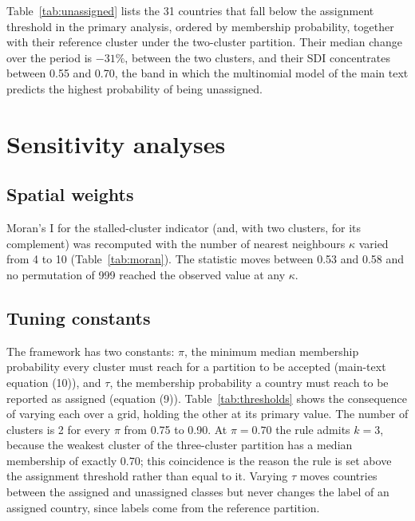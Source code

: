 \documentclass[11pt,a4paper]{article}
\begin{document}
Table~\ref{tab:unassigned} lists the 31 countries that fall below the assignment threshold in the primary analysis, ordered by membership probability, together with their reference cluster under the two-cluster partition. Their median change over the period is $-31\%$, between the two clusters, and their SDI concentrates between 0.55 and 0.70, the band in which the multinomial model of the main text predicts the highest probability of being unassigned.

\begin{table}[h]
\centering\small
\caption{Countries unassigned in the primary analysis. The reference cluster is the label the country carries in the two-cluster partition before the threshold is applied.}
\label{tab:unassigned}
\end{table}

\section{Sensitivity analyses}

\subsection{Spatial weights}

Moran's I for the stalled-cluster indicator (and, with two clusters, for its complement) was recomputed with the number of nearest neighbours $\kappa$ varied from 4 to 10 (Table~\ref{tab:moran}). The statistic moves between 0.53 and 0.58 and no permutation of 999 reached the observed value at any $\kappa$.

\begin{table}[h]
\centering\small
\caption{Moran's I of assigned membership by number of nearest neighbours. Six neighbours is the primary choice.}
\label{tab:moran}

\end{table}

\subsection{Tuning constants}

The framework has two constants: $\pi$, the minimum median membership probability every cluster must reach for a partition to be accepted (main-text equation (10)), and $\tau$, the membership probability a country must reach to be reported as assigned (equation (9)). Table~\ref{tab:thresholds} shows the consequence of varying each over a grid, holding the other at its primary value. The number of clusters is 2 for every $\pi$ from 0.75 to 0.90. At $\pi = 0.70$ the rule admits $k = 3$, because the weakest cluster of the three-cluster partition has a median membership of exactly 0.70; this coincidence is the reason the rule is set above the assignment threshold rather than equal to it. Varying $\tau$ moves countries between the assigned and unassigned classes but never changes the label of an assigned country, since labels come from the reference partition.
\end{document}
